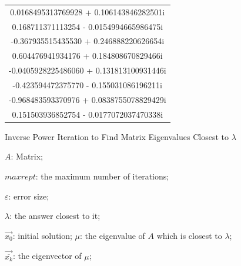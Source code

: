 \documentclass[12pt,a4paper,UTF8]{ctexart}
\begin{document}
\begin{enumerate}
\begin{longtable}{c}
              0.0168495313769928     +   0.106143846282501i   \\
              0.168711371113254      -   0.0154994665986475i  \\
              -0.367935515435530     +   0.246888220626654i   \\
              0.604476941934176      +   0.184808670829466i   \\
              -0.0405928225486060    +   0.131813100931446i   \\
              -0.423594472375770     -   0.155031086196211i   \\
              -0.968483593370976     +   0.0838755078829429i  \\
              0.151503936852754      -   0.0177072037470338i
          \end{longtable}

          \begin{algorithm}[H]
              \caption{Inverse Power Iteration to Find Matrix Eigenvalues Closest to $\lambda$}
              \label{alg::conjugateGradien}
              \begin{algorithmic}[1]
                  \Require
                  $A$: Matrix;

                  $maxrept$: the maximum number of iterations;

                  $\varepsilon $: error size;

                  $\lambda$: the answer closest to it;

                  $\overrightarrow{x_{0}} $: initial solution;
                  \Ensure
                  $\mu $: the eigenvalue of $A$ which is closest to $\lambda$;

                  $\overrightarrow{\overline{x_{k}} }$: the eigenvector of $\mu$;


\end{algorithmic}
\end{algorithm}
\end{enumerate}
\end{document}
